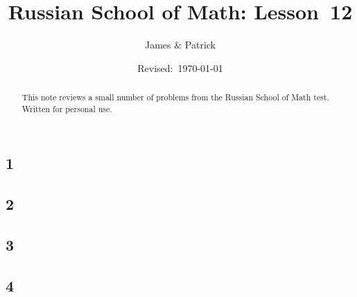 \documentclass[12pt]{article}
\title{Russian School of Math: Lesson~12}
\author{James \& Patrick}
\date{Revised:~\today}
\begin{document}
\maketitle
\begin{abstract}\setlength{\parindent}{0pt}%
This note reviews a small number of problems from the Russian School of Math test. Written for personal use.
\end{abstract}

\thispagestyle{empty}
\clearpage

\subsection*{1}

\begin{solution}
  
\end{solution}

\subsection*{2}

\begin{solution}
  
\end{solution}

\subsection*{3}

\begin{solution}
  
\end{solution}

\subsection*{4}

\begin{solution}
  
\end{solution}
\end{document}
